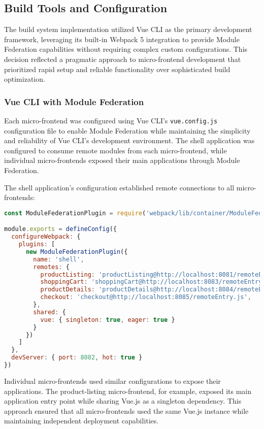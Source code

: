 \documentclass[12pt,a4paper]{report}
\begin{document}
\subsection{Build Tools and Configuration}

The build system implementation utilized Vue CLI as the primary development framework, leveraging its built-in Webpack 5 integration to provide Module Federation capabilities without requiring complex custom configurations. This decision reflected a pragmatic approach to micro-frontend development that prioritized rapid setup and reliable functionality over sophisticated build optimization.

\subsubsection{Vue CLI with Module Federation}

Each micro-frontend was configured using Vue CLI's \texttt{vue.config.js} configuration file to enable Module Federation while maintaining the simplicity and reliability of Vue CLI's development environment. The shell application was configured to consume remote modules from each micro-frontend, while individual micro-frontends exposed their main applications through Module Federation.

The shell application's configuration established remote connections to all micro-frontends:

\begin{lstlisting}[language=JavaScript, caption=Shell Application Vue Configuration]
const ModuleFederationPlugin = require('webpack/lib/container/ModuleFederationPlugin')

module.exports = defineConfig({
  configureWebpack: {
    plugins: [
      new ModuleFederationPlugin({
        name: 'shell',
        remotes: {
          productListing: 'productListing@http://localhost:8081/remoteEntry.js',
          shoppingCart: 'shoppingCart@http://localhost:8083/remoteEntry.js',
          productDetails: 'productDetails@http://localhost:8084/remoteEntry.js',
          checkout: 'checkout@http://localhost:8085/remoteEntry.js',
        },
        shared: {
          vue: { singleton: true, eager: true }
        }
      })
    ]
  },
  devServer: { port: 8082, hot: true }
})
\end{lstlisting}

Individual micro-frontends used similar configurations to expose their applications. The product-listing micro-frontend, for example, exposed its main application entry point while sharing Vue.js as a singleton dependency. This approach ensured that all micro-frontends used the same Vue.js instance while maintaining independent deployment capabilities.
\end{document}
